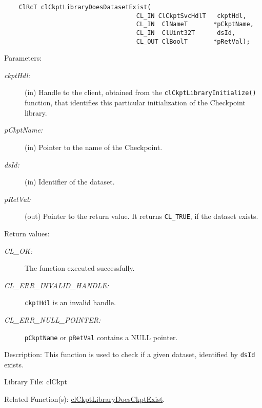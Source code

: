 \begin{flushleft}
\begin{Desc}
\footnotesize\begin{verbatim}    ClRcT clCkptLibraryDoesDatasetExist(
                                	CL_IN ClCkptSvcHdlT   ckptHdl,
                                	CL_IN  ClNameT       *pCkptName,
                                	CL_IN  ClUint32T      dsId,
                                	CL_OUT ClBoolT       *pRetVal);
\end{verbatim}
\normalsize
\end{Desc}
\begin{Desc}
\item[Parameters:]
\begin{description}
\item[{\em ckpt\-Hdl:}](in) Handle to the client, obtained from the {\tt{clCkptLibraryInitialize()}} function, that identifies this particular 
initialization of the Checkpoint library. \item[{\em p\-Ckpt\-Name:}](in) Pointer to the name of the Checkpoint. 
\item[{\em ds\-Id:}](in) Identifier of the dataset.
\item[{\em p\-Ret\-Val:}](out) Pointer to the return value. It returns {\tt{CL\_\-TRUE}}, if the dataset exists.\end{description}
\end{Desc}
\begin{Desc}
\item[Return values:]
\begin{description}
\item[{\em CL\_\-OK:}]The function executed successfully. 
\item[{\em CL\_\-ERR\_\-INVALID\_\-HANDLE:}]{\tt{ckptHdl}} is an invalid handle.
\item[{\em CL\_\-ERR\_\-NULL\_\-POINTER:}]{\tt{pCkptName}} or {\tt{pRetVal}} contains a NULL pointer.\end{description}
\end{Desc}
\begin{Desc}
\item[Description:]This function is used to check if a given dataset, identified by {\tt{dsId}} exists.\end{Desc}
\begin{Desc}
\item[Library File:]cl\-Ckpt\end{Desc}
\begin{Desc}
\item[Related Function(s):]\hyperlink{pageckpt209}{cl\-Ckpt\-Library\-Does\-Ckpt\-Exist}. \end{Desc}
\newpage





\end{flushleft}
